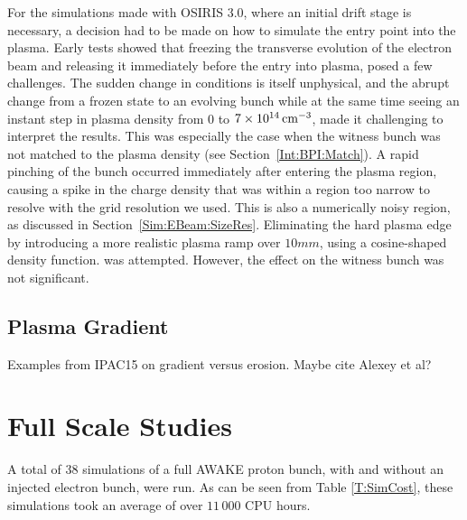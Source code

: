For the simulations made with OSIRIS 3.0, where an initial drift stage is necessary, a decision had to be made on how to simulate the entry point into the plasma.
Early tests showed that freezing the transverse evolution of the electron beam and releasing it immediately before the entry into plasma, posed a few challenges.
The sudden change in conditions is itself unphysical, and the abrupt change from a frozen state to an evolving bunch while at the same time seeing an instant step in plasma density from $0$ to $7\times 10^{14}\,\mathrm{cm}^{-3}$, made it challenging to interpret the results.
This was especially the case when the witness bunch was not matched to the plasma density (see Section~\ref{Int:BPI:Match}).
A rapid pinching of the bunch occurred immediately after entering the plasma region, causing a spike in the charge density that was within a region too narrow to resolve with the grid resolution we used.
This is also a numerically noisy region, as discussed in Section~\ref{Sim:EBeam:SizeRes}.
Eliminating the hard plasma edge by introducing a more realistic plasma ramp over $10\unit{mm}$, using a cosine-shaped density function. was attempted.
However, the effect on the witness bunch was not significant.

\subsection{Plasma Gradient}
\label{Sim:Plasma:Grad}

Examples from IPAC15 on gradient versus erosion. Maybe cite Alexey et al?

\section{Full Scale Studies}
\label{Sim:Plasma}

A total of $38$ simulations of a full AWAKE proton bunch, with and without an injected electron bunch, were run.
As can be seen from Table \ref{T:SimCost}, these simulations took an average of over $11\,000$ CPU hours.



